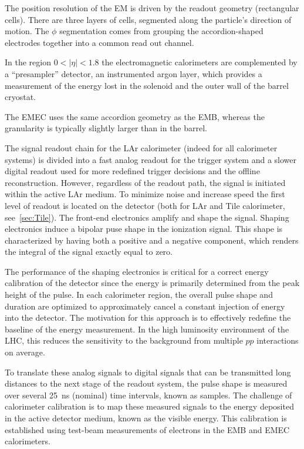 The position resolution of the EM is driven by the readout geometry (rectangular cells). There are three layers of cells, segmented along the particle's direction of motion.  The $\phi$ segmentation comes from grouping the accordion-shaped electrodes together into a common read out channel. 

In the region $0 <|\eta| < 1.8$ the electromagnetic calorimeters are complemented by a ``presampler'' detector, an instrumented argon layer, which provides a measurement of the energy lost in the solenoid and the outer wall of the barrel cryostat.

The EMEC uses the same accordion geometry as the EMB, whereas the granularity is typically slightly larger than in the barrel.

The signal readout chain for the LAr calorimeter (indeed for all calorimeter systems) is divided into a fast analog readout for the trigger system and a slower digital readout used for more redefined trigger decisions and the offline reconstruction. However, regardless of the readout path, the signal is initiated within the active LAr medium. To minimize noise and increase speed the first level of readout is located on the detector (both for LAr and Tile calorimeter, see~\ref{sec:Tile}). The front-end electronics amplify and shape the signal. Shaping electronics induce a bipolar puse shape in the ionization signal. This shape is characterized by having both a positive and a negative component, which renders the integral of the signal exactly equal to zero.

The performance of the shaping electronics is critical for a correct energy calibration of the detector since the energy is primarily determined from the peak height of the pulse. %
In each calorimeter region, the overall pulse shape and duration are optimized to approximately cancel a constant injection of energy into the detector. The motivation for this approach is to effectively redefine the baseline of the energy measurement. In the high luminosity environment of the LHC, this reduces the sensitivity to the background from multiple $pp$ interactions on average.

To translate these analog signals to digital signals that can be transmitted long distances to the next stage of the readout system, the pulse shape is measured over several 25~ns (nominal) time intervals, known as samples. The challenge of calorimeter calibration is to map these measured signals to the energy deposited in the active detector medium, known as the visible energy. This calibration is established using test-beam measurements of electrons in the EMB %
and EMEC calorimeters. %


